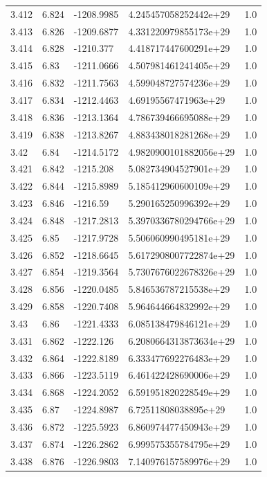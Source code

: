 \begin{tabular}{lllll}
3.412 & 6.824 & -1208.9985 & 4.245457058252442e+29 & 1.0 \\
3.413 & 6.826 & -1209.6877 & 4.331220979855173e+29 & 1.0 \\
3.414 & 6.828 & -1210.377 & 4.418717447600291e+29 & 1.0 \\
3.415 & 6.83 & -1211.0666 & 4.507981461241405e+29 & 1.0 \\
3.416 & 6.832 & -1211.7563 & 4.599048727574236e+29 & 1.0 \\
3.417 & 6.834 & -1212.4463 & 4.69195567471963e+29 & 1.0 \\
3.418 & 6.836 & -1213.1364 & 4.786739466695088e+29 & 1.0 \\
3.419 & 6.838 & -1213.8267 & 4.883438018281268e+29 & 1.0 \\
3.42 & 6.84 & -1214.5172 & 4.9820900101882056e+29 & 1.0 \\
3.421 & 6.842 & -1215.208 & 5.082734904527901e+29 & 1.0 \\
3.422 & 6.844 & -1215.8989 & 5.185412960600109e+29 & 1.0 \\
3.423 & 6.846 & -1216.59 & 5.290165250996392e+29 & 1.0 \\
3.424 & 6.848 & -1217.2813 & 5.3970336780294766e+29 & 1.0 \\
3.425 & 6.85 & -1217.9728 & 5.506060990495181e+29 & 1.0 \\
3.426 & 6.852 & -1218.6645 & 5.6172908007722874e+29 & 1.0 \\
3.427 & 6.854 & -1219.3564 & 5.7307676022678326e+29 & 1.0 \\
3.428 & 6.856 & -1220.0485 & 5.846536787215538e+29 & 1.0 \\
3.429 & 6.858 & -1220.7408 & 5.964644664832992e+29 & 1.0 \\
3.43 & 6.86 & -1221.4333 & 6.085138479846121e+29 & 1.0 \\
3.431 & 6.862 & -1222.126 & 6.2080664313873634e+29 & 1.0 \\
3.432 & 6.864 & -1222.8189 & 6.333477692276483e+29 & 1.0 \\
3.433 & 6.866 & -1223.5119 & 6.461422428690006e+29 & 1.0 \\
3.434 & 6.868 & -1224.2052 & 6.591951820228549e+29 & 1.0 \\
3.435 & 6.87 & -1224.8987 & 6.72511808038895e+29 & 1.0 \\
3.436 & 6.872 & -1225.5923 & 6.860974477450943e+29 & 1.0 \\
3.437 & 6.874 & -1226.2862 & 6.999575355784795e+29 & 1.0 \\
3.438 & 6.876 & -1226.9803 & 7.140976157589976e+29 & 1.0 \\

\end{tabular}
